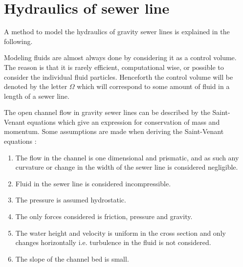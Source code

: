 ﻿\section{Hydraulics of sewer line}\label{se:hydraulics_of_sewer_line}
A method to model the hydraulics of gravity sewer lines is explained in the following. 

Modeling fluids are almost always done by considering it as a control volume. The reason is that it is rarely efficient, computational wise, or possible to consider the individual fluid particles.
Henceforth the control volume will be denoted by the letter $\Omega$ which will correspond to some amount of fluid in a length of a sewer line.		

The open channel flow in gravity sewer lines can be described by the Saint-Venant equations which give an expression for conservation of mass and momentum.
Some assumptions are made when deriving the Saint-Venant equations \cite{schutze2011modelling}:

\begin{table}[H]
\begin{enumerate}
\item The flow in the channel is one dimensional and prismatic, and as such any curvature or change in the width of the sewer line is considered negligible.
\item Fluid in the sewer line is considered incompressible. 
\item The pressure is assumed hydrostatic.
\item The only forces considered is friction, pressure and gravity.
\item The water height and velocity is uniform in the cross section and only changes horizontally i.e. turbulence in the fluid is not considered.
\item The slope of the channel bed is small.
\end{enumerate}
\label{tab:saintbernard_assumptions}
\end{table}

